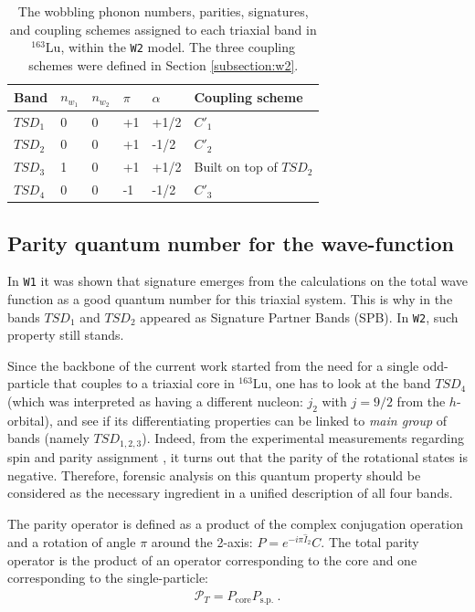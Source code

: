 \documentclass[myclassdoc,debug]{rjparticle}
\begin{document}
\begin{table}
\caption{The wobbling phonon numbers, parities, signatures, and coupling schemes assigned to each triaxial band in $^{163}$Lu, within the \texttt{W2} model. The three coupling schemes were defined in Section \ref{subsection:w2}.}
\centering
\begin{tabular}{llllll}
\hline
Band & $n_{w_1}$ & $n_{w_2}$ & $\pi$ & $\alpha$ & Coupling scheme\\
\hline
\hline
   $TSD_1$  &   0        &    0       & +1      &    +1/2      &   $C'_1$              \\
   $TSD_2$  &     0      &      0     &   +1    &  -1/2        &   $C'_2$              \\
   $TSD_3$  &   1        &      0     &     +1  &     +1/2    &  Built on top of $TSD_2$                \\
   $TSD_4$  &    0       &      0     &      -1 &   -1/2       &    $C'_3$    \\       
   \hline
\end{tabular}
\label{energy-states-tabular}
\end{table}

\subsection{Parity quantum number for the wave-function}

In \texttt{W1} it was shown that signature emerges from the calculations on the total wave function as a good quantum number for this triaxial system. This is why in \cite{raduta2020approach} the bands $TSD_1$ and $TSD_2$ appeared as Signature Partner Bands (SPB). In \texttt{W2}, such property still stands.

Since the backbone of the current work started from the need for a single odd-particle that couples to a triaxial core in $^{163}$Lu, one has to look at the band $TSD_4$ (which was interpreted as having a different nucleon: $j_2$ with $j=9/2$ from the $h$-orbital), and see if its differentiating properties can be linked to \emph{main group} of bands (namely $TSD_{1,2,3}$). Indeed, from the experimental measurements regarding spin and parity assignment \cite{jensen2004coexisting}, it turns out that the parity of the rotational states is negative. Therefore, forensic analysis on this quantum property should be considered as the necessary ingredient in a unified description of all four bands.

 The parity operator is defined as a product of the complex conjugation operation and a rotation of angle $\pi$ around the 2-axis: $P=e^{-i\pi\hat{I}_2}C$. The total parity operator is the product of an operator corresponding to the core and one corresponding to the single-particle:
\begin{align}
    \mathcal{P}_T=P_\text{core}P_\text{s.p.}\ .
    \label{parity-operator}
\end{align}
\end{document}
